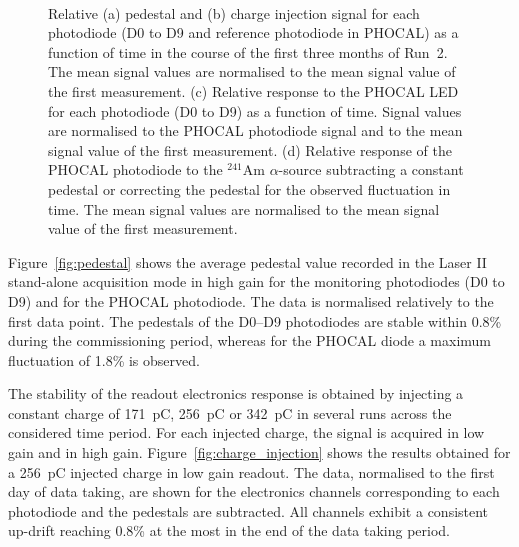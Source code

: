 \begin{figure}[htbp]
\begin{center}
\\
    \caption{Relative (a) pedestal and (b) charge injection signal for each photodiode (D0 to D9 and reference photodiode in PHOCAL) as a function of time in the course of the first three months of Run~2. The mean signal values are normalised to the mean signal value of the first measurement. (c) Relative response to the PHOCAL LED for each photodiode (D0 to D9) as a function of time. Signal values are normalised to the PHOCAL photodiode signal and to the mean signal value of the first measurement. (d) Relative response of the PHOCAL photodiode to the $^{241}$Am $\alpha$-source subtracting a constant pedestal or correcting the pedestal for the observed fluctuation in time. The mean signal values are normalised to the mean signal value of the first measurement.}\label{fig:laser_stability}
\end{center}
\end{figure}

Figure~\ref{fig:pedestal} shows the average pedestal value recorded in the Laser II stand-alone acquisition mode in high gain for the monitoring photodiodes (D0 to D9) and for the PHOCAL photodiode. The data is normalised relatively to the first data point. The pedestals of the D0--D9 photodiodes are stable within 0.8\% during the commissioning period, whereas for the PHOCAL diode a maximum fluctuation of 1.8\% is observed. 

The stability of the readout electronics response is obtained by injecting a constant charge of 171~pC, 256~pC or 342~pC in several runs across the considered time period. For each injected charge, the signal is acquired in low gain and in high gain. Figure~\ref{fig:charge_injection} shows the results obtained for a 256~pC injected charge in low gain readout. The data, normalised to the first day of data taking, are shown for the electronics channels corresponding to each photodiode and the pedestals are subtracted. All channels exhibit a consistent up-drift reaching 0.8\% at the most in the end of the data taking period. 

